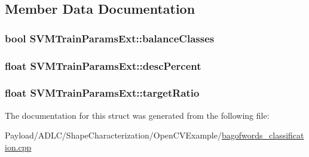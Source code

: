 \subsection{Member Data Documentation}
\hypertarget{structSVMTrainParamsExt_a13677c5f8d3e2871193d01808ebf9726}{
\subsubsection[{balance\-Classes}]{\setlength{\rightskip}{0pt plus 5cm}bool S\-V\-M\-Train\-Params\-Ext\-::balance\-Classes}}\label{structSVMTrainParamsExt_a13677c5f8d3e2871193d01808ebf9726}
\hypertarget{structSVMTrainParamsExt_ad1203861c6c4a5a10403d3a2308d6d30}{
\subsubsection[{desc\-Percent}]{\setlength{\rightskip}{0pt plus 5cm}float S\-V\-M\-Train\-Params\-Ext\-::desc\-Percent}}\label{structSVMTrainParamsExt_ad1203861c6c4a5a10403d3a2308d6d30}
\hypertarget{structSVMTrainParamsExt_a1e8099e1ff299cad8fe5c7fcf4e5fd07}{
\subsubsection[{target\-Ratio}]{\setlength{\rightskip}{0pt plus 5cm}float S\-V\-M\-Train\-Params\-Ext\-::target\-Ratio}}\label{structSVMTrainParamsExt_a1e8099e1ff299cad8fe5c7fcf4e5fd07}


The documentation for this struct was generated from the following file\-:\begin{DoxyCompactItemize}
\item 
Payload/\-A\-D\-L\-C/\-Shape\-Characterization/\-Open\-C\-V\-Example/\hyperlink{bagofwords__classification_8cpp}{bagofwords\-\_\-classification.\-cpp}\end{DoxyCompactItemize}
